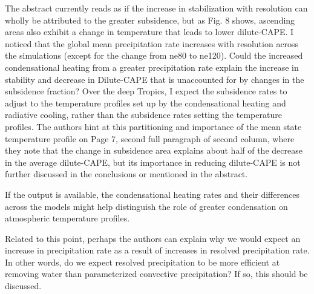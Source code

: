\documentclass[12pt,oneside,a4paper]{article}%
\begin{document}
The abstract currently reads as if the increase in stabilization with resolution can wholly be attributed to the greater subsidence, but as Fig. 8 shows, ascending areas also exhibit a change in temperature that leads to lower dilute-CAPE. I noticed that the global mean precipitation rate increases with resolution across the simulations (except for the change from ne80 to ne120). Could the increased condensational heating from a greater precipitation rate explain the increase in stability and decrease in Dilute-CAPE that is unaccounted for by changes in the subsidence fraction? Over the deep Tropics, I expect the subsidence rates to adjust to the temperature profiles set up by the condensational heating and radiative cooling, rather than the subsidence rates setting the temperature profiles. The authors hint at this partitioning and importance of the mean state temperature profile on Page 7, second full paragraph of second column, where they note that the change in subsidence area explains about half of the decrease in the average dilute-CAPE, but its importance in reducing dilute-CAPE is not further discussed in the conclusions or mentioned in the abstract. \newline

If the output is available, the condensational heating rates and their differences across the models might help distinguish the role of greater condensation on atmospheric temperature profiles. \newline

Related to this point, perhaps the authors can explain why we would expect an increase in precipitation rate as a result of increases in resolved precipitation rate. In other words, do we expect resolved precipitation to be more efficient at removing water than parameterized convective precipitation? If so, this should be discussed. \newline

{} \newline
\end{document}

